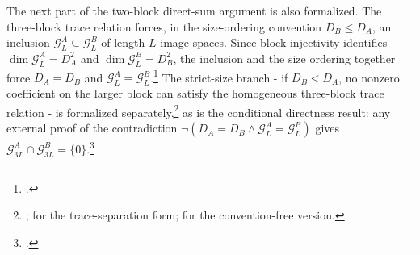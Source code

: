 \documentclass{article}
\begin{document}
The next part of the two-block direct-sum argument is also formalized. The
three-block trace relation forces, in the size-ordering convention $D_B\le D_A$,
an inclusion $\mathcal G_L^A\subseteq\mathcal G_L^B$ of length-$L$ image
spaces. Since block injectivity identifies $\dim\mathcal G_L^A=D_A^2$ and
$\dim\mathcal G_L^B=D_B^2$, the inclusion and the size ordering together
force $D_A=D_B$ and $\mathcal G_L^A=\mathcal G_L^B$.\footnote{%
.}
The strict-size branch - if $D_B<D_A$, no nonzero coefficient on the larger
block can satisfy the homogeneous three-block trace relation - is formalized
separately,\footnote{%
;
for the trace-separation form; 
for the convention-free version.}
as is the conditional directness result: any external proof of the
contradiction $\neg(D_A=D_B\wedge\mathcal G_L^A=\mathcal G_L^B)$ gives
$\mathcal G_{3L}^A\cap\mathcal G_{3L}^B=\{0\}$.\footnote{%
.}
\end{document}

